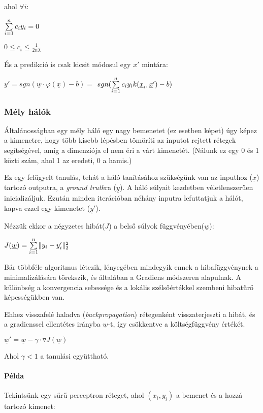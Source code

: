 \noindent
ahol $ \forall i: $

$  \sum\limits_{{i}=1}^{n} c_i y_i = 0 $

$ 0 \leq c_i \leq \frac{1}{2n\lambda} $

\noindent
És a predikció is csak kicsit módosul
egy $ x' $ mintára:

$ y' = sgn(\underline{w} \cdot \varphi(\underline{x}) - b) = $
$ sgn(\sum\limits_{{i}=1}^{n} c_i y_i k(\underline{x}_i, \underline{x}') - b) $




\subsubsection{Mély hálók}

Általánosságban egy mély háló egy nagy bemenetet (ez esetben képet) úgy képez
a kimenetre, hogy több kisebb lépésben tömöríti az inputot rejtett rétegek segítségével,
amíg a dimenziója el nem éri a várt kimenetét. 
(Nálunk ez egy 0 és 1 közti szám, ahol 1 az eredeti, 0 a hamis.)


Ez egy felügyelt tanulás, tehát a háló tanításához szükségünk van az inputhoz ($ \underline{x} $) 
tartozó outputra, a \textit{ground truth}ra ($ \underline{y} $). 
A háló súlyait kezdetben véletlenszerűen inicializáljuk.
Ezután minden iterációban néhány inputra lefuttatjuk a hálót, 
kapva ezzel egy kimenetet ($ \underline{y}' $).

\noindent
Nézzük ekkor a négyzetes hibát($ J $) a belső súlyok függvényében($ \underline{w} $):

$ J(\underline{w}) = \sum\limits_{{i}=1}^{n} \lVert y_i-y_i'\rVert_2^2 $

\noindent
Bár többféle algoritmus létezik, lényegében mindegyik ennek a hibafüggvénynek
a minimalizálására törekszik, és általában a Gradiens módszeren alapulnak.
A különbség a konvergencia sebessége és a lokális szélsőértékkel szembeni 
hibatűrő képességükben van.

Ehhez visszafelé haladva (\textit{backpropagation}) rétegenként visszaterjeszti a hibát,
és a gradienssel ellentétes irányba $ \underline{w} $-t, így csökkentve a költségfüggvény értékét.


$ \underline{w}' = \underline{w} - \gamma \cdot \triangledown J(\underline{w})$

\noindent
Ahol $ \gamma < 1 $ a tanulási együttható.


\noindent
\paragraph{Példa}
Tekintsünk egy sűrű perceptron réteget, ahol $ (x_i, y_i) $ a 
bemenet és a hozzá tartozó kimenet:

